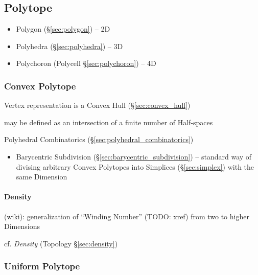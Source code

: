 \subsection{Polytope}\label{sec:polytope}

\begin{itemize}
  \item Polygon (\S\ref{sec:polygon}) -- 2D
  \item Polyhedra (\S\ref{sec:polyhedra}) -- 3D
  \item Polychoron (Polycell \S\ref{sec:polychoron}) -- 4D
\end{itemize}



\subsubsection{Convex Polytope}\label{sec:convex_polytope}

Vertex representation is a Convex Hull (\S\ref{sec:convex_hull})

may be defined as an intersection of a finite number of Half-spaces

\fist Polyhedral Combinatorics (\S\ref{sec:polyhedral_combinatorics})

\begin{itemize}
  \item Barycentric Subdivision (\S\ref{sec:barycentric_subdivision}) --
    standard way of divising arbitrary Convex Polytopes into Simplices
    (\S\ref{sec:simplex}) with the same Dimension
\end{itemize}



\paragraph{Density}\label{sec:polytope_density}\hfill

(wiki): generalization of ``Winding Number'' (TODO: xref) from two to higher
Dimensions

cf. \emph{Density} (Topology \S\ref{sec:density})



\subsubsection{Uniform Polytope}\label{sec:uniform_polytope}

